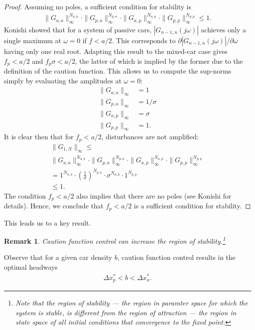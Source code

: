 \documentclass[10pt,twocolumn]{article}
\theoremstyle{ss}
\newtheorem{rmk}{Remark}[section]
\begin{document}
\begin{proof}
Assuming no poles, a sufficient condition for stability is
\begin{align*}
\|G_{a,a}\|_{\infty}^{N_{a,a}} \cdot \|G_{p,a}\|_{\infty}^{N_{p,a}} \cdot \|G_{a,p}\|_{\infty}^{N_{a,p}} \cdot \|G_{p,p}\|_{\infty}^{N_{p,p}} \leq 1.
\end{align*}
Konishi \cite{Konishi} showed that for a system of passive cars, $|G_{n-1,n}(j\omega)|$ achieves only a single maximum at $\omega=0$ if $f < a/2$. This corresponds to $\partial |G_{n-1,n}(j\omega)|/\partial \omega$ having only one real root. Adapting this result to the mixed-car case gives $f_p < a/2$ and $f_p\sigma < a/2$, the latter of which is implied by the former due to the definition of the caution function. This allows us to compute the sup-norms simply by evaluating the amplitudes at $\omega=0$:
\begin{align*}
\|G_{a,a}\|_{\infty} &= 1\\
\|G_{p,a}\|_{\infty} &= 1/\sigma\\
\|G_{a,p}\|_{\infty} &= \sigma\\
\|G_{p,p}\|_{\infty} &= 1.
\end{align*}
It is clear then that for $f_p < a/2$, disturbances are not amplified:
\begin{gather}
\|G_{1,N}\|_{\infty} \leq\\
\|G_{a,a}\|_{\infty}^{N_{a,a}} \cdot \|G_{p,a}\|_{\infty}^{N_{p,a}} \cdot \|G_{a,p}\|_{\infty}^{N_{a,p}} \cdot \|G_{p,p}\|_{\infty}^{N_{p,p}} \\
= 1^{N_{a,a}} \cdot \left(\frac{1}{\sigma}\right)^{N_{p,a}} \cdot \sigma^{N_{a,p}} \cdot 1^{N_{p,p}} \\
\leq 1.
\end{gather}
The condition $f_p < a/2$ also implies that there are no poles (see Konishi \cite{Konishi} for details). Hence, we conclude that $f_p < a/2$ is a sufficient condition for stability.
\end{proof}
This leads us to a key result.
\begin{rmk}
Caution function control can increase the region of stability.\footnote{Note that the region of stability --- the region in paramter space for which the system is stable, is different from the region of {\em attraction} --- the region in state space of all initial conditions that convergence to the fixed point.}
\end{rmk}
Observe that for a given car density $b$, caution function control results in the optimal headways 
\begin{gather}
\Delta x_p^* < b < \Delta x_a^*.
\end{gather}
\end{document}
